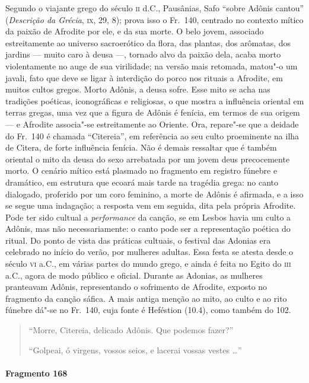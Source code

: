 {\small Segundo o viajante grego do século \textsc{ii} d.C., Pausânias, Safo “sobre
Adônis cantou” (\textit{Descrição da Grécia}, \textsc{ix}, 29, 8); prova isso o Fr.~140, 
centrado no contexto mítico da paixão de Afrodite por ele, e da sua morte.
O belo jovem, associado estreitamente ao universo sacroerótico da
flora, das plantas, dos arômatas, dos jardins --- muito caro à deusa ---,
tornado alvo da paixão dela, acaba morto violentamente no auge de sua
virilidade; na versão mais retomada, matou"-o um javali, fato que deve se ligar
à interdição do porco nos rituais a Afrodite, em muitos cultos gregos. Morto
Adônis, a deusa sofre. Esse mito se acha nas tradições poéticas, iconográficas
e religiosas, o que mostra a influência oriental em terras gregas, uma vez que
a figura de Adônis é fenícia, em termos de sua origem --- e Afrodite associa"-se
estreitamente ao Oriente. Ora, repare"-se que a deidade do Fr.~140 é chamada
``Citereia”, em referência ao seu culto proeminente na ilha de Citera,
de forte influência fenícia. Não é demais ressaltar que é também oriental o
mito da deusa do sexo arrebatada por um jovem deus precocemente morto. O
cenário mítico está plasmado no fragmento em registro fúnebre e dramático, em
estrutura que ecoará mais tarde na tragédia grega: no canto dialogado,
proferido por um coro feminino, a morte de Adônis é afirmada, e a isso
se segue uma indagação; a resposta vem em seguida, dita pela própria Afrodite.
Pode ter sido cultual a \textit{performance} da canção, se em Lesbos havia um
culto a Adônis, mas não necessariamente: o canto pode ser a representação
poética do ritual. Do ponto de vista das práticas cultuais, o festival das Adonias 
era celebrado no início do verão, por mulheres adultas. Essa festa se atesta 
desde o século \textsc{vi} a.C., em várias partes do
mundo grego, e ainda é feita no Egito do \textsc{iii} a.C., agora de modo público e
oficial. Durante as Adonias, as mulheres pranteavam Adônis, representando o
sofrimento de Afrodite, exposto no fragmento da canção sáfica. A mais antiga
menção ao mito, ao culto e ao rito fúnebre dá"-se no Fr.~140, cuja fonte é
Heféstion (10.4), como também do 102.}

\begin{verse}
“Morre, Citereia, delicado Adônis. Que podemos fazer?”

“Golpeai, ó virgens, vossos seios, e lacerai vossas vestes \ldots{}”
\end{verse}

\paragraph{Fragmento 168}

